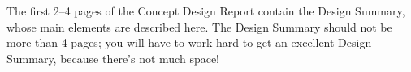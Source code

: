 \documentclass[letterpaper, 11pt, twoside, article]{memoir}
\begin{document}

The first 2--4 pages of the Concept Design Report contain the Design Summary, whose main elements are described here.  The Design Summary should not be more than 4 pages; you will have to work hard to get an excellent Design Summary, because there's not much space!









\end{document}
